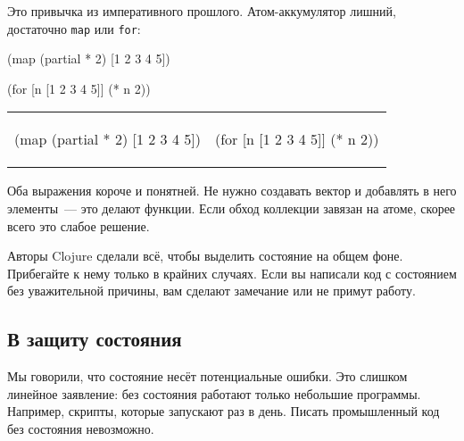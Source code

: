 
Это привычка из императивного прошлого. Атом-аккумулятор лишний, достаточно
\verb|map| или \verb|for|:

\ifnarrow

\begin{english}
  \begin{clojure}
(map (partial * 2)
     [1 2 3 4 5])
  \end{clojure}

\splitter

  \begin{clojure}
(for [n [1 2 3 4 5]]
  (* n 2))
  \end{clojure}
\end{english}

\else

\begin{english}

\noindent
\begin{tabular}{ @{}p{5cm} @{}p{5cm} }

  \begin{clojure}
(map (partial * 2)
     [1 2 3 4 5])
  \end{clojure}

&

  \begin{clojure}
(for [n [1 2 3 4 5]]
  (* n 2))
  \end{clojure}

\end{tabular}

\end{english}

\fi

Оба выражения короче и понятней. Не нужно создавать вектор и добавлять в него
элементы~--- это делают функции. Если обход коллекции завязан на
атоме, скорее всего это слабое решение.

Авторы Clojure сделали всё, чтобы выделить состояние на общем фоне. Прибегайте к
нему только в крайних случаях. Если вы написали код с состоянием без
уважительной причины, вам сделают замечание или не примут работу.


\subsection{В защиту состояния}

Мы говорили, что состояние несёт потенциальные ошибки. Это слишком линейное
заявление: без состояния работают только небольшие программы. Например, скрипты,
которые запускают раз в день. Писать промышленный код без состояния невозможно.


